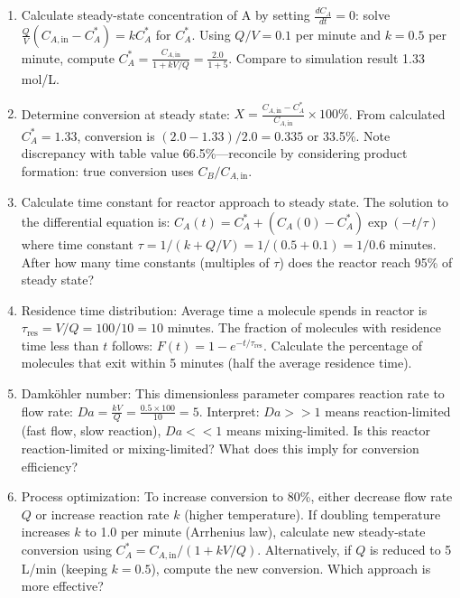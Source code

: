 \documentclass[12pt]{article}
\begin{document}
\begin{enumerate}[label=(\alph*)]
\item Calculate steady-state concentration of A by setting $\frac{dC_A}{dt} = 0$: solve $\frac{Q}{V}(C_{A,\text{in}} - C_A^*) = kC_A^*$ for $C_A^*$. Using $Q/V = 0.1$ per minute and $k = 0.5$ per minute, compute $C_A^* = \frac{C_{A,\text{in}}}{1 + kV/Q} = \frac{2.0}{1 + 5}$. Compare to simulation result 1.33 mol/L.

\item Determine conversion at steady state: $X = \frac{C_{A,\text{in}} - C_A^*}{C_{A,\text{in}}} \times 100\%$. From calculated $C_A^* = 1.33$, conversion is $(2.0 - 1.33)/2.0 = 0.335$ or 33.5\%. Note discrepancy with table value 66.5\%—reconcile by considering product formation: true conversion uses $C_B/C_{A,\text{in}}$.

\item Calculate time constant for reactor approach to steady state. The solution to the differential equation is: $C_A(t) = C_A^* + (C_A(0) - C_A^*)\exp(-t/\tau)$ where time constant $\tau = 1/(k + Q/V) = 1/(0.5 + 0.1) = 1/0.6$ minutes. After how many time constants (multiples of $\tau$) does the reactor reach 95\% of steady state?

\item Residence time distribution: Average time a molecule spends in reactor is $\tau_{\text{res}} = V/Q = 100/10 = 10$ minutes. The fraction of molecules with residence time less than $t$ follows: $F(t) = 1 - e^{-t/\tau_{\text{res}}}$. Calculate the percentage of molecules that exit within 5 minutes (half the average residence time).

\item Damköhler number: This dimensionless parameter compares reaction rate to flow rate: $Da = \frac{kV}{Q} = \frac{0.5 \times 100}{10} = 5$. Interpret: $Da >> 1$ means reaction-limited (fast flow, slow reaction), $Da << 1$ means mixing-limited. Is this reactor reaction-limited or mixing-limited? What does this imply for conversion efficiency?

\item Process optimization: To increase conversion to 80\%, either decrease flow rate $Q$ or increase reaction rate $k$ (higher temperature). If doubling temperature increases $k$ to 1.0 per minute (Arrhenius law), calculate new steady-state conversion using $C_A^* = C_{A,\text{in}}/(1 + kV/Q)$. Alternatively, if $Q$ is reduced to 5 L/min (keeping $k = 0.5$), compute the new conversion. Which approach is more effective?
\end{enumerate}
\end{document}
